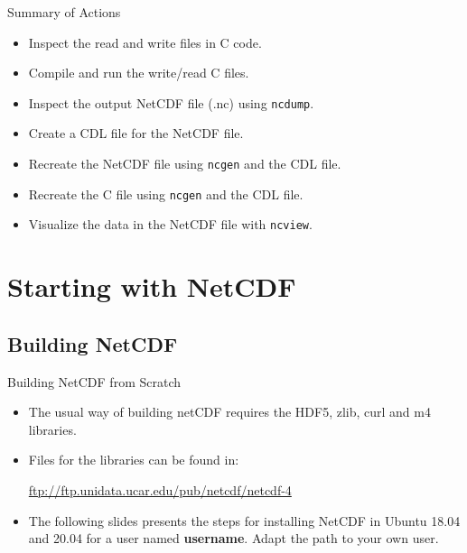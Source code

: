 \documentclass[compress,11pt,xcolor=svgnames,aspectratio=169]{beamer}
\begin{document}
\begin{frame}[fragile]{Summary of Actions}

\begin{itemize}
\setlength\itemsep{0.3cm}

  \item Inspect the read and write files in C code.
  \item Compile and run the write/read C files.
  \item Inspect the output NetCDF file (.nc) using \texttt{ncdump}.
  \item Create a CDL file for the NetCDF file.
  \item Recreate the NetCDF file using \texttt{ncgen} and the CDL file.
  \item Recreate the C file using \texttt{ncgen} and the CDL file.
  \item Visualize the data in the NetCDF file with \texttt{ncview}.

\end{itemize}

\end{frame}

\appendix

\begin{frame}[fragile]{}

{ \huge \color{EsiBlue}{ Appendix}}

\end{frame}

\section{Starting with NetCDF}
\label{ap:netcdf}

\subsection{Building NetCDF}

\begin{frame}[fragile]{Building NetCDF from Scratch}

\begin{itemize}
\setlength\itemsep{0.8cm}

  \item The usual way of building netCDF requires the HDF5, zlib, curl and m4 libraries.

  \item Files for the libraries can be found in:

  \begin{center}
  \url{ftp://ftp.unidata.ucar.edu/pub/netcdf/netcdf-4}
  \end{center}

  \item The following slides presents the steps for installing NetCDF in Ubuntu 18.04 and 20.04 for a user named \textbf{username}. Adapt the path to your own user.

\end{itemize}

\end{frame}
\end{document}
